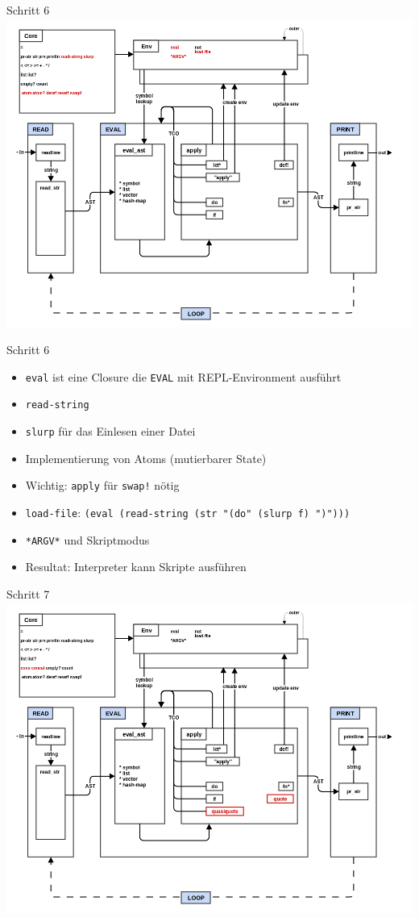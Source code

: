 \documentclass[presentation]{beamer}
\begin{document}
\begin{frame}[label=sec-3-20]{Schritt 6}
\includegraphics[width=.9\linewidth]{./images/step6_file.png}
\end{frame}

\begin{frame}[fragile,label=sec-3-21]{Schritt 6}
 \begin{itemize}
\item \texttt{eval} ist eine Closure die \texttt{EVAL} mit REPL-Environment ausführt
\item \texttt{read-string}
\item \texttt{slurp} für das Einlesen einer Datei
\item Implementierung von Atoms (mutierbarer State)
\item Wichtig: \texttt{apply} für \texttt{swap!} nötig
\item \texttt{load-file}: \texttt{(eval (read-string (str "(do" (slurp f) ")")))}
\item \texttt{*ARGV*} und Skriptmodus
\item Resultat: Interpreter kann Skripte ausführen
\end{itemize}
\end{frame}

\begin{frame}[label=sec-3-22]{Schritt 7}
\includegraphics[width=.9\linewidth]{./images/step7_quote.png}
\end{frame}
\end{document}
